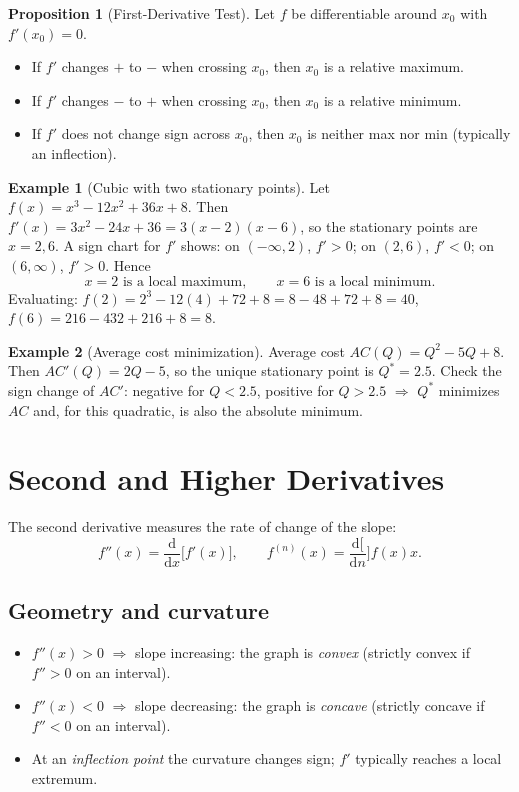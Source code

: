 \documentclass[12pt]{article}
\newcommand{\dtotal}[2]{\frac{\mathrm{d} #1}{\mathrm{d} #2}}
\theoremstyle{definition}
\newtheorem{example}{Example}
\newtheorem{proposition}{Proposition}
\begin{document}
\begin{proposition}[First-Derivative Test]
Let $f$ be differentiable around $x_0$ with $f'(x_0)=0$.
\begin{itemize}[leftmargin=1.5em]
\item If $f'$ changes $+$ to $-$ when crossing $x_0$, then $x_0$ is a relative maximum.
\item If $f'$ changes $-$ to $+$ when crossing $x_0$, then $x_0$ is a relative minimum.
\item If $f'$ does not change sign across $x_0$, then $x_0$ is neither max nor min (typically an inflection).
\end{itemize}
\end{proposition}

\begin{example}[Cubic with two stationary points]
Let $f(x)=x^3-12x^2+36x+8$. Then $f'(x)=3x^2-24x+36=3(x-2)(x-6)$, so the stationary points are $x=2,6$.
A sign chart for $f'$ shows: on $( -\infty,2)$, $f'>0$; on $(2,6)$, $f'<0$; on $(6,\infty)$, $f'>0$. Hence
\[
x=2\text{ is a local maximum},\qquad x=6\text{ is a local minimum}.
\]
Evaluating: $f(2)=2^3-12(4)+72+8=8-48+72+8=40$, $f(6)=216-432+216+8=8$.
\end{example}

\begin{example}[Average cost minimization]
Average cost $AC(Q)=Q^2-5Q+8$. Then $AC'(Q)=2Q-5$, so the unique stationary point is $Q^\ast=2.5$. Check the sign change of $AC'$: negative for $Q<2.5$, positive for $Q>2.5$ $\Rightarrow$ $Q^\ast$ minimizes $AC$ and, for this quadratic, is also the absolute minimum.
\end{example}



\section{Second and Higher Derivatives}

The second derivative measures the rate of change of the slope:
\[
f''(x)=\dtotal{}{x}\!\big[f'(x)\big],\qquad
f^{(n)}(x)=\dtotal[n]{f(x)}{x}.
\]

\subsection*{Geometry and curvature}
\begin{itemize}[leftmargin=1.5em]
\item $f''(x)>0$ $\Rightarrow$ slope increasing: the graph is \emph{convex} (strictly convex if $f''>0$ on an interval).
\item $f''(x)<0$ $\Rightarrow$ slope decreasing: the graph is \emph{concave} (strictly concave if $f''<0$ on an interval).
\item At an \emph{inflection point} the curvature changes sign; $f'$ typically reaches a local extremum.
\end{itemize}
\end{document}
